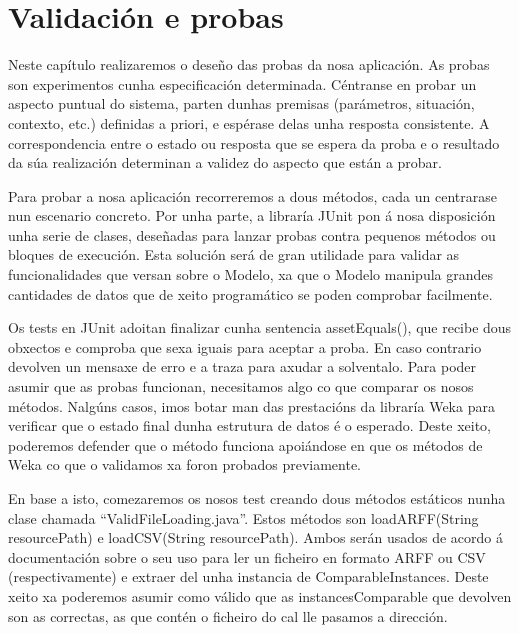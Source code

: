 \chapter{Validación e probas}

Neste capítulo realizaremos o deseño das probas da nosa aplicación. As probas son experimentos cunha especificación determinada. Céntranse en probar un aspecto puntual do sistema, parten dunhas premisas (parámetros, situación, contexto, etc.) definidas a priori, e espérase delas unha resposta consistente. A correspondencia entre o estado ou resposta que se espera da proba e o resultado da súa realización determinan a validez do aspecto que están a probar.

Para probar a nosa aplicación recorreremos a dous métodos, cada un centrarase nun escenario concreto. Por unha parte, a libraría JUnit pon á nosa disposición unha serie de clases, deseñadas para lanzar probas contra pequenos métodos ou bloques de execución. Esta solución será de gran utilidade para validar as funcionalidades que versan sobre o Modelo, xa que o Modelo manipula grandes cantidades de datos que de xeito programático se poden comprobar facilmente.

Os tests en JUnit adoitan finalizar cunha sentencia assetEquals(), que recibe dous obxectos e comproba que sexa iguais para aceptar a proba. En caso contrario devolven un mensaxe de erro e a traza para axudar a solventalo. Para poder asumir que as probas funcionan, necesitamos algo co que comparar os nosos métodos. Nalgúns casos, imos botar man das prestacións da libraría Weka para verificar que o estado final dunha estrutura de datos é o esperado. Deste xeito, poderemos defender que o método funciona apoiándose en que os métodos de Weka co que o validamos xa foron probados previamente.

En base a isto, comezaremos os nosos test creando dous métodos estáticos nunha clase chamada ``ValidFileLoading.java''. Estos métodos son loadARFF(String resourcePath) e loadCSV(String resourcePath). Ambos serán usados de acordo á documentación sobre o seu uso para ler un ficheiro en formato ARFF ou CSV (respectivamente) e extraer del unha instancia de ComparableInstances. Deste xeito xa poderemos asumir como válido que as instancesComparable que devolven son as correctas, as que contén o ficheiro do cal lle pasamos a dirección.

